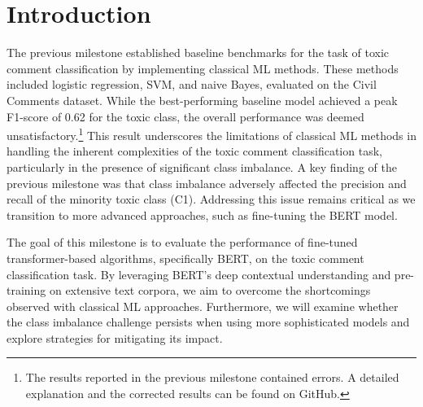 \section{Introduction}\label{sec:intro}

The previous milestone established baseline benchmarks for the task of toxic comment classification by implementing classical ML methods. These methods included logistic regression, SVM, and naive Bayes, evaluated on the Civil Comments dataset. While the best-performing baseline model achieved a peak F1-score of 0.62 for the toxic class, the overall performance was deemed unsatisfactory.\footnote{The results reported in the previous milestone contained errors. A detailed explanation and the corrected results can be found on GitHub.}
This result underscores the limitations of classical ML methods in handling the inherent complexities of the toxic comment classification task, particularly in the presence of significant class imbalance. A key finding of the previous milestone was that class imbalance adversely affected the precision and recall of the minority toxic class (C1). Addressing this issue remains critical as we transition to more advanced approaches, such as fine-tuning the BERT model.

The goal of this milestone is to evaluate the performance of fine-tuned transformer-based algorithms, specifically BERT, on the toxic comment classification task. By leveraging BERT's deep contextual understanding and pre-training on extensive text corpora, we aim to overcome the shortcomings observed with classical ML approaches. Furthermore, we will examine whether the class imbalance challenge persists when using more sophisticated models and explore strategies for mitigating its impact.
\begin{comment}
    This report is structured as follows. \Cref{sec:meth} provides a concise description of the methods employed, including data preprocessing, model selection, and hyperparameter optimization. \Cref{sec:generalization} discusses generalization, showcasing some best and worst case predictions. \Cref{sec:results} presents the experimental results, including detailed performance metrics, error analysis, and comparisons to baseline methods. Finally, \cref{sec:discussion} evaluates the computational efficiency of the fine-tuning process, explores confidence measures for predictions, and assesses the overall suitability of BERT for this application.

Through this milestone, we aim to establish a robust evaluation of BERT's capabilities and its advantages over classical baselines, paving the way for further refinements in toxic comment classification.
\end{comment}
